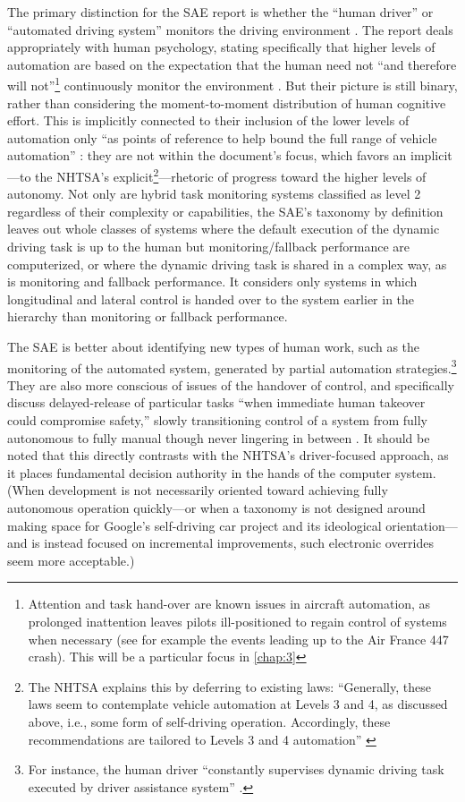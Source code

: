 The primary distinction for the SAE report is whether the ``human driver'' or ``automated
driving system'' monitors the driving environment \cite[p. 5]{SAE}. The report deals
appropriately with human psychology, stating specifically that higher
levels of automation are based on the expectation that the human need
not ``and therefore will not''\footnote{Attention and task hand-over are
  known issues in aircraft automation, as prolonged inattention leaves
  pilots ill-positioned to regain control of systems when necessary
  (see for example the events leading up to the Air France 447
  crash). This will be a particular focus in \ref{chap:3}} continuously
monitor the environment \cite[p. 9]{SAE}. But their 
picture is still binary, rather than considering the moment-to-moment
distribution of human 
cognitive effort. This is implicitly connected to their inclusion of
the lower levels of automation only ``as points of reference to help
bound the full range of vehicle automation'' \cite[p. 2]{SAE}: they are not within
the document's focus, which favors an implicit---to the NHTSA's
explicit\footnote{The NHTSA explains this by deferring to existing
  laws: ``Generally, these laws seem to contemplate vehicle 
automation at Levels 3 and 4, as discussed above, i.e., some form of
self-driving operation. 
Accordingly, these recommendations are tailored to Levels 3 and 4
automation'' \cite[p. 10]{NHTSA}}---rhetoric of progress toward the
higher levels of autonomy. 
Not only are hybrid task monitoring systems classified as level 2
regardless of their complexity or capabilities, the SAE's taxonomy by
definition leaves out whole classes of systems where the default
execution of the dynamic driving task is up to the human but
monitoring/fallback performance are computerized, or where the dynamic
driving task is shared in a complex way, as is monitoring and fallback
performance. It considers only systems in which longitudinal and
lateral control is handed over to the system earlier in the hierarchy
than monitoring or fallback performance.

The SAE is better about
identifying new types of human work, such as the monitoring of the
automated system, generated by partial automation
strategies.\footnote{For instance, the human driver ``constantly
  supervises dynamic driving task executed by driver assistance
  system'' \cite[p. 3]{SAE}.} They
are also more conscious of issues of the handover of control, and
specifically discuss delayed-release of particular tasks ``when
immediate human takeover could compromise safety,'' slowly
transitioning control of a system from fully autonomous to fully
manual though never lingering in between \cite[p. 4]{SAE}. It should be
noted that this directly contrasts with the NHTSA's driver-focused
approach, as it places fundamental decision authority in the hands of
the computer system. (When development is not necessarily oriented
toward achieving fully autonomous operation quickly---or when a
taxonomy is not designed around making space for Google's self-driving
car project and its ideological orientation---and is instead
focused on incremental improvements, such electronic overrides seem more acceptable.)

